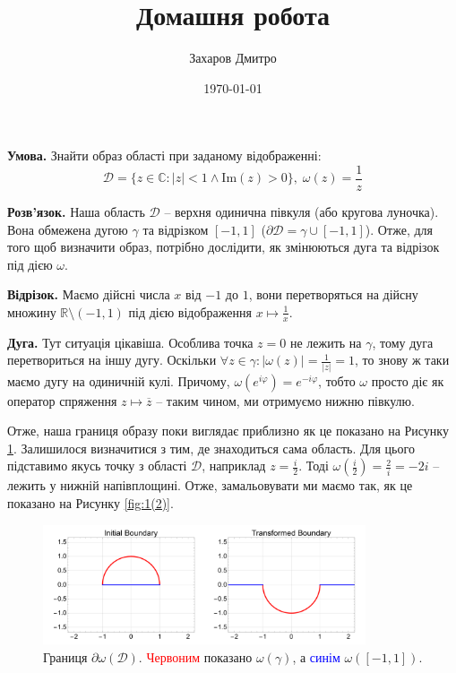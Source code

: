 \documentclass[oneside,solution]{karazin-complan-assign}
\title{Домашня робота}
\author{Захаров Дмитро}
\date{\today}
\begin{document}
\maketitle



\hspace{20px}\textbf{Умова.} Знайти образ області при заданому відображенні:
\begin{equation}
    \mathcal{D} = \{z \in \mathbb{C}: |z|<1 \wedge \text{Im}(z) > 0\}, \; \omega(z) = \frac{1}{z}
\end{equation}

\textbf{Розв'язок.} Наша область $\mathcal{D}$ -- верхня одинична півкуля (або кругова луночка). Вона обмежена дугою $\gamma$ та відрізком $[-1,1]$ ($\partial\mathcal{D} = \gamma \cup [-1,1]$). Отже, для того щоб визначити образ, потрібно дослідити, як змінюються дуга та відрізок під дією $\omega$.

\textbf{Відрізок.} Маємо дійсні числа $x$ від $-1$ до $1$, вони перетворяться на дійсну множину $\mathbb{R} \setminus (-1,1)$ під дією відображення $x \mapsto \frac{1}{x}$.

\textbf{Дуга.} Тут ситуація цікавіша. Особлива точка $z=0$ не лежить на $\gamma$, тому дуга перетвориться на іншу дугу. Оскільки $\forall z \in \gamma: |\omega(z)| = \frac{1}{|z|} = 1$, то знову ж таки маємо дугу на одиничній кулі. Причому, $\omega(e^{i\varphi}) = e^{-i\varphi}$, тобто $\omega$ просто діє як оператор спряження $z \mapsto \overline{z}$ -- таким чином, ми отримуємо нижню півкулю. 

Отже, наша границя образу поки виглядає приблизно як це показано на Рисунку \ref{fig:1(1)}. Залишилося визначитися з тим, де знаходиться сама область. Для цього підставимо якусь точку з області $\mathcal{D}$, наприклад $z=\frac{i}{2}$. Тоді $\omega(\frac{i}{2}) = \frac{2}{i} = -2i$ -- лежить у нижній напівплощині. Отже, замальовувати ми маємо так, як це показано на Рисунку \ref{fig:1(2)}.

\begin{figure}
    \centering
    \includegraphics[width=0.85\textwidth]{images/hw_5/problem_1(1).pdf}
    \caption{Границя $\partial\omega(\mathcal{D})$. \textcolor{red}{Червоним} показано $\omega(\gamma)$, а \textcolor{blue}{синім} $\omega([-1,1])$.}
    \label{fig:1(1)}
\end{figure}
\end{document}
